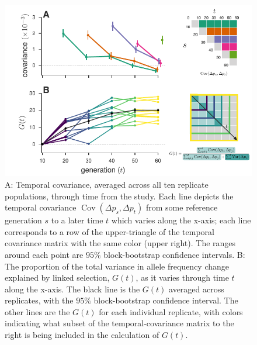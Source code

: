\documentclass[11pt]{article}
\DeclareMathOperator{\cov}{Cov}
\begin{document}
\begin{figure}[!ht]
  \centering
  \includegraphics[width=\textwidth]{figures/figure-1.pdf}

  \caption{A: Temporal covariance, averaged across all ten replicate
    populations, through time from the \textcite{Barghi2019-qy} study. Each
    line depicts the temporal covariance $\cov(\Delta p_s, \Delta p_t)$ from
    some reference generation $s$ to a later time $t$ which varies along the
    x-axis; each line corresponds to a row of the upper-triangle of the
    temporal covariance matrix with the same color (upper right). The ranges
    around each point are $95\%$ block-bootstrap confidence intervals. B: The
    proportion of the total variance in allele frequency change explained by
    linked selection, $G(t)$, as it varies through time $t$ along the x-axis.
    The black line is the $G(t)$ averaged across replicates, with the $95\%$
    block-bootstrap confidence interval. The other lines are the $G(t)$ for
    each individual replicate, with colors indicating what subset of the
    temporal-covariance matrix to the right is being included in the
  calculation of $G(t)$.}

  \label{fig:figure-1}
\end{figure}
\end{document}
